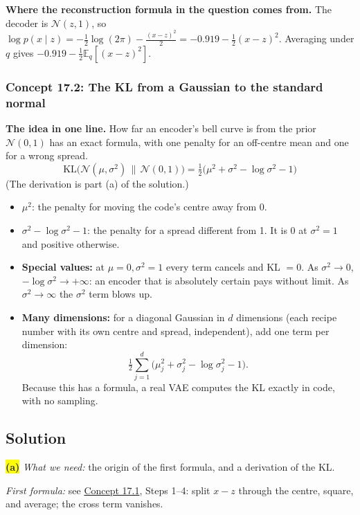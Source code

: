\documentclass[12pt,a4paper]{article}
\begin{document}
\textbf{Where the reconstruction formula in the question comes from.} The decoder is $\mathcal{N}(z,1)$, so $\log p(x\mid z)=-\frac12\log(2\pi)-\frac{(x-z)^2}{2}=-0.919-\frac12(x-z)^2$. Averaging under $q$ gives $-0.919-\frac12\mathbb{E}_q[(x-z)^2]$.

\subsubsection{Concept 17.2: The KL from a Gaussian to the standard normal}\label{c17-2}

\textbf{The idea in one line.} How far an encoder's bell curve is from the prior $\mathcal{N}(0,1)$ has an exact formula, with one penalty for an off-centre mean and one for a wrong spread.
\[
\mathrm{KL}\big(\mathcal{N}(\mu,\sigma^2)\,\|\,\mathcal{N}(0,1)\big)=\tfrac12\big(\mu^2+\sigma^2-\log\sigma^2-1\big)
\]
(The derivation is part (a) of the solution.)
\begin{itemize}[nosep]
  \item $\mu^2$: the penalty for moving the code's centre away from 0.
  \item $\sigma^2-\log\sigma^2-1$: the penalty for a spread different from 1. It is 0 at $\sigma^2=1$ and positive otherwise.
  \item \textbf{Special values:} at $\mu=0,\sigma^2=1$ every term cancels and KL $=0$. As $\sigma^2\to0$, $-\log\sigma^2\to+\infty$: an encoder that is absolutely certain pays without limit. As $\sigma^2\to\infty$ the $\sigma^2$ term blows up.
  \item \textbf{Many dimensions:} for a diagonal Gaussian in $d$ dimensions (each recipe number with its own centre and spread, independent), add one term per dimension:
  \[
  \tfrac12\sum_{j=1}^{d}\big(\mu_j^2+\sigma_j^2-\log\sigma_j^2-1\big).
  \]
  Because this has a formula, a real VAE computes the KL exactly in code, with no sampling.
\end{itemize}

\subsection{Solution}

\colorbox{yellow}{\textbf{(a)}} \emph{What we need:} the origin of the first formula, and a derivation of the KL.

\emph{First formula:} see \hyperref[c17-1]{Concept 17.1}, Steps 1--4: split $x-z$ through the centre, square, and average; the cross term vanishes.
\end{document}
